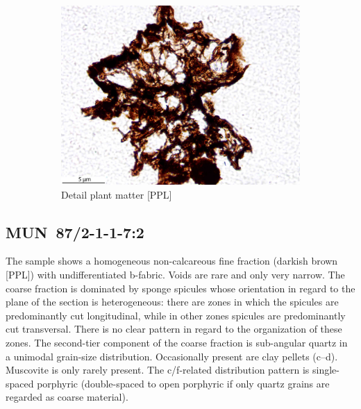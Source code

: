 \documentclass[a4paper]{article}
\begin{document}
\begin{figure}[H]
\begin{subfigure}[t]{.32\textwidth}
		\includegraphics[width=\textwidth]{ThinSections/104-2_40x_PPL.jpg}
		\caption{Detail plant matter [PPL]}
	\end{subfigure}
	\caption{}
	\label{fig:104_mun}
\end{figure}

\newpage\subsection{MUN~87/2-1-1-7:2 \citep[mun\#105; Fig.~\ref{fig:mun.pottery}.6; Pikunda-Munda style;][472 Pl.~91.6]{Seidensticker.2021e}}

\begin{multicols}{2}
\noindent The sample shows a homogeneous non-calcareous fine fraction (darkish brown [PPL]) with undifferentiated b-fabric. Voids are rare and only very narrow. The coarse fraction is dominated by sponge spicules whose orientation in regard to the plane of the section is heterogeneous: there are zones in which the spicules are predominantly cut longitudinal, while in other zones spicules are predominantly cut transversal. There is no clear pattern in regard to the organization of these zones. The second-tier component of the coarse fraction is sub-angular quartz in a unimodal grain-size distribution. Occasionally present are clay pellets (c--d). Muscovite is only rarely present. The c/f-related distribution pattern is single-spaced porphyric (double-spaced to open porphyric if only quartz grains are regarded as coarse material).
\end{multicols}
\end{document}
